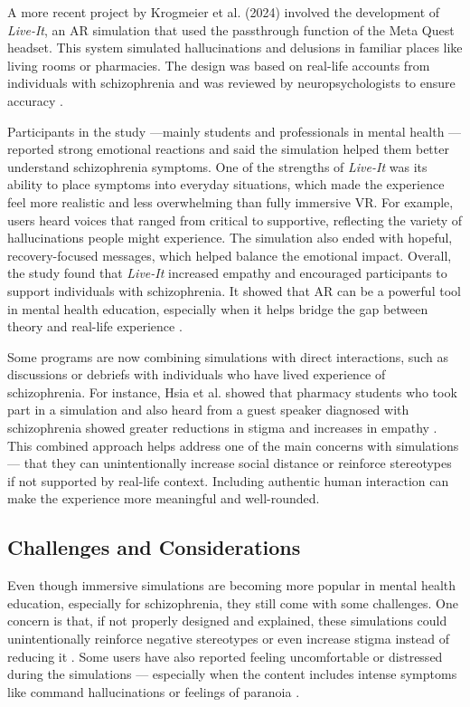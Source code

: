 A more recent project by Krogmeier et al. (2024) involved the development of \textit{Live-It}, an AR simulation that used the passthrough function of the Meta Quest headset. This system simulated hallucinations and delusions in familiar places like living rooms or pharmacies. The design was based on real-life accounts from individuals with schizophrenia and was reviewed by neuropsychologists to ensure accuracy \cite{Krogmeier2024}.

Participants in the study  —mainly students and professionals in mental health — reported strong emotional reactions and said the simulation helped them better understand schizophrenia symptoms. One of the strengths of \textit{Live-It} was its ability to place symptoms into everyday situations, which made the experience feel more realistic and less overwhelming than fully immersive VR. For example, users heard voices that ranged from critical to supportive, reflecting the variety of hallucinations people might experience. The simulation also ended with hopeful, recovery-focused messages, which helped balance the emotional impact. Overall, the study found that \textit{Live-It} increased empathy and encouraged participants to support individuals with schizophrenia. It showed that AR can be a powerful tool in mental health education, especially when it helps bridge the gap between theory and real-life experience \cite{Krogmeier2024}.

Some programs are now combining simulations with direct interactions, such as discussions or debriefs with individuals who have lived experience of schizophrenia. For instance, Hsia et al. showed that pharmacy students who took part in a simulation and also heard from a guest speaker diagnosed with schizophrenia showed greater reductions in stigma and increases in empathy \cite{Hsia2022}. This combined approach helps address one of the main concerns with simulations — that they can unintentionally increase social distance or reinforce stereotypes if not supported by real-life context. Including authentic human interaction can make the experience more meaningful and well-rounded. 

\subsection{Challenges and Considerations}

Even though immersive simulations are becoming more popular in mental health education, especially for schizophrenia, they still come with some challenges. One concern is that, if not properly designed and explained, these simulations could unintentionally reinforce negative stereotypes or even increase stigma instead of reducing it \cite{Ando2011}. Some users have also reported feeling uncomfortable or distressed during the simulations — especially when the content includes intense symptoms like command hallucinations or feelings of paranoia \cite{Chaffin2013, Zare-Bidaki2022}.

